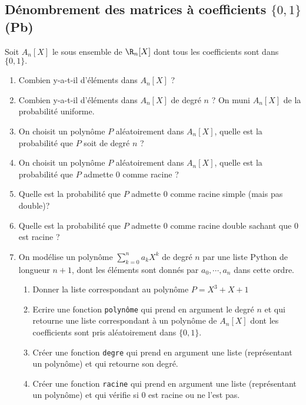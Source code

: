 
\subsection{Dénombrement des matrices à coefficients $\{ 0,1\}$ (Pb)}
\begin{exercice}
Soit $A_n[X]$ le sous ensemble de $\R_n[X]$ dont tous les coefficients sont dans $\{0,1\}.$ 

\begin{enumerate}
\item Combien y-a-t-il d'éléments dans $A_n[X]$  ?
\item Combien y-a-t-il d'éléments dans $A_n[X]$ de degré $n$ ? 
On muni $A_n[X]$ de la probabilité uniforme. 
\item On choisit un polynôme $P$ aléatoirement dans $A_n[X]$, quelle est la probabilité que $P$ soit de degré $n$ ? 
\item On choisit un polynôme $P$ aléatoirement dans $A_n[X]$, quelle est la probabilité que $P$ admette 0 comme racine ? 
\item Quelle est la probabilité que $P$ admette $0$ comme racine simple (mais pas double)? 
\item Quelle est la probabilité que $P$ admette $0$ comme racine double sachant que $0$ est racine  ? 
\item On modélise un polynôme  $\sum_{k=0}^na_k X^k$ de degré $n$ par une liste Python de longueur $n+1$, dont les éléments sont donnés par $a_0,\cdots, a_n$ dans cette ordre. 
\begin{enumerate}
\item Donner la liste correspondant au polynôme  $P = X^3+X+1$
\item Ecrire une fonction \texttt{polynôme} qui prend en argument le degré $n$ et qui retourne une liste correspondant à un polynôme de $A_n[X]$ dont les coefficients sont pris aléatoirement dans $\{0,1\}$. 
\item Créer une fonction \texttt{degre} qui prend en argument une liste (représentant un polynôme) et qui retourne son degré. 
\item Créer une fonction \texttt{racine} qui prend en argument une liste (représentant un polynôme) et qui vérifie si $0$ est racine ou ne l'est pas. 
\end{enumerate}
\end{enumerate} 
\end{exercice}


